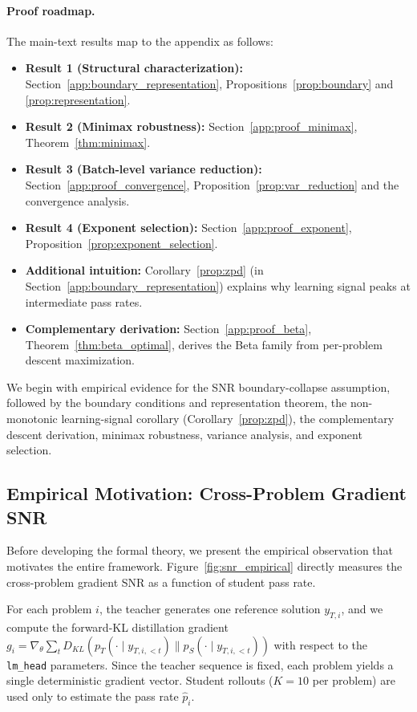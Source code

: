 \documentclass{article}
\begin{document}
\paragraph{Proof roadmap.}
The main-text results map to the appendix as follows:
\begin{itemize}
  \item \textbf{Result 1 (Structural characterization):} Section~\ref{app:boundary_representation}, Propositions~\ref{prop:boundary} and \ref{prop:representation}.
  \item \textbf{Result 2 (Minimax robustness):} Section~\ref{app:proof_minimax}, Theorem~\ref{thm:minimax}.
  \item \textbf{Result 3 (Batch-level variance reduction):} Section~\ref{app:proof_convergence}, Proposition~\ref{prop:var_reduction} and the convergence analysis.
  \item \textbf{Result 4 (Exponent selection):} Section~\ref{app:proof_exponent}, Proposition~\ref{prop:exponent_selection}.
  \item \textbf{Additional intuition:} Corollary~\ref{prop:zpd} (in Section~\ref{app:boundary_representation}) explains why learning signal peaks at intermediate pass rates.
  \item \textbf{Complementary derivation:} Section~\ref{app:proof_beta}, Theorem~\ref{thm:beta_optimal}, derives the Beta family from per-problem descent maximization.
\end{itemize}
We begin with empirical evidence for the SNR boundary-collapse assumption, followed by the boundary conditions and representation theorem, the non-monotonic learning-signal corollary (Corollary~\ref{prop:zpd}), the complementary descent derivation, minimax robustness, variance analysis, and exponent selection.

\subsection{Empirical Motivation: Cross-Problem Gradient SNR}
\label{app:snr}

Before developing the formal theory, we present the empirical observation that motivates the entire framework. Figure~\ref{fig:snr_empirical} directly measures the cross-problem gradient SNR as a function of student pass rate.

For each problem $i$, the teacher generates one reference solution $y_{T,i}$, and we compute the forward-KL distillation gradient $g_i = \nabla_\theta \sum_t D_{KL}(p_T(\cdot \mid y_{T,i,<t}) \| p_S(\cdot \mid y_{T,i,<t}))$ with respect to the \texttt{lm\_head} parameters. Since the teacher sequence is fixed, each problem yields a single deterministic gradient vector. Student rollouts ($K{=}10$ per problem) are used only to estimate the pass rate $\hat{p}_i$.
\end{document}
